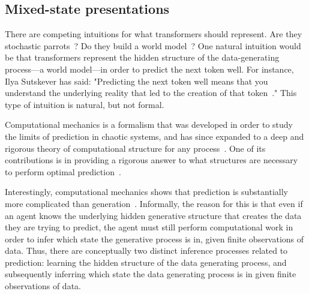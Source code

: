 \documentclass{article}
\begin{document}

\subsection{Mixed-state presentations}

There are competing intuitions for what transformers should represent.
Are they stochastic parrots~\cite{bender2021dangers}?
Do they build a world model~\cite{ha2018world}?
One natural intuition would be that transformers represent the hidden structure of the data-generating process---a world model---in order to predict the next token well.
For instance, Ilya Sutskever has said: "Predicting the next token well means that you understand the underlying reality that led to the creation of that token~\cite{Sutskever2023}." This type of intuition is natural, but %
not formal.

 Computational mechanics is a formalism that was developed in order to study the limits of prediction in chaotic systems, and has since expanded to a deep and rigorous theory of computational structure for any process~\cite{Crut12a}. One of its contributions is in providing a rigorous answer to what structures are necessary to perform optimal prediction~\cite{Shal98a}.
 
 Interestingly, computational mechanics shows that prediction is substantially more complicated than generation~\cite{lohr2012predictive, ruebeck2018prediction}. Informally, the reason for this is that even if an agent knows the underlying hidden generative structure that creates the data they are trying to predict, the agent must still perform computational work in order to infer which state the generative process is in, given finite observations of data. Thus, there are conceptually two distinct inference processes related to prediction: learning the hidden structure of the data generating process, and subsequently inferring which state the data generating process is in given finite observations of data.
 
\end{document}
